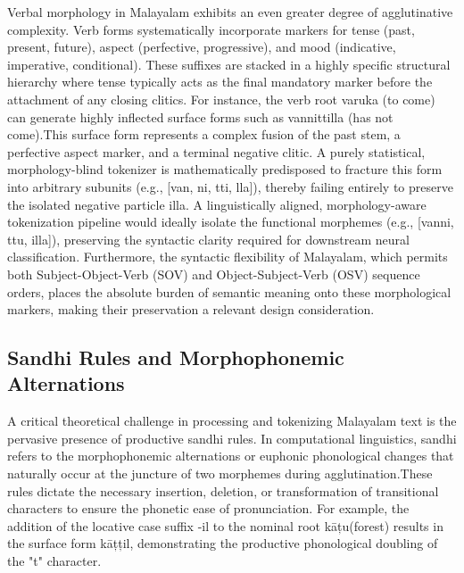 \documentclass[12pt]{article}
\begin{document}
	Verbal morphology in Malayalam exhibits an even greater degree of agglutinative complexity. Verb forms systematically incorporate markers for tense (past, present, future), aspect (perfective, progressive), and mood (indicative, imperative, conditional). These suffixes are stacked in a highly specific structural hierarchy where tense typically acts as the final mandatory marker before the attachment of any closing clitics. For instance, the verb root varuka (to come) can generate highly inflected surface forms such as vannittilla (has not come).This surface form represents a complex fusion of the past stem, a perfective aspect marker, and a terminal negative clitic. A purely statistical, morphology-blind tokenizer is mathematically predisposed to fracture this form into arbitrary subunits (e.g., [van, ni, tti, lla]), thereby failing entirely to preserve the isolated negative particle illa. A linguistically aligned, morphology-aware tokenization pipeline would ideally isolate the functional morphemes (e.g., [vanni, ttu, illa]), preserving the syntactic clarity required for downstream neural classification. Furthermore, the syntactic flexibility of Malayalam, which permits both Subject-Object-Verb (SOV) and Object-Subject-Verb (OSV) sequence orders, places the absolute burden of semantic meaning onto these morphological markers, making their preservation a relevant design consideration. 
	
	\subsection{Sandhi Rules and Morphophonemic Alternations }
	
	A critical theoretical challenge in processing and tokenizing Malayalam text is the pervasive presence of productive sandhi rules. In computational linguistics, sandhi refers to the morphophonemic alternations or euphonic phonological changes that naturally occur at the juncture of two morphemes during agglutination.These rules dictate the necessary insertion, deletion, or transformation of transitional characters to ensure the phonetic ease of pronunciation. For example, the addition of the locative case suffix -il to the nominal root kāțu(forest) results in the surface form kāțțil, demonstrating the productive phonological doubling of the "t" character. 
	
\end{document}
